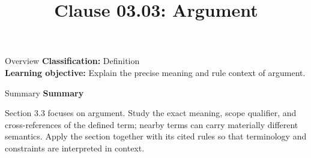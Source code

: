 \documentclass[10pt,letterpaper]{article}
\title{Clause 03.03: Argument}
\author{}
\date{}
\begin{document}
\maketitle
\begin{CornellOverviewBox}{Overview}
\textbf{Classification:} Definition\\[2pt]
\textbf{Learning objective:} Explain the precise meaning and rule context of argument.
\end{CornellOverviewBox}\begin{CornellSummaryBox}{Summary}
{\sffamily\bfseries\color{Accent} Summary}\par\vspace{3pt}Section 3.3 focuses on argument. Study the exact meaning, scope qualifier, and cross-references of the defined term; nearby terms can carry materially different semantics. Apply the section together with its cited rules so that terminology and constraints are interpreted in context.
\end{CornellSummaryBox}
\end{document}
